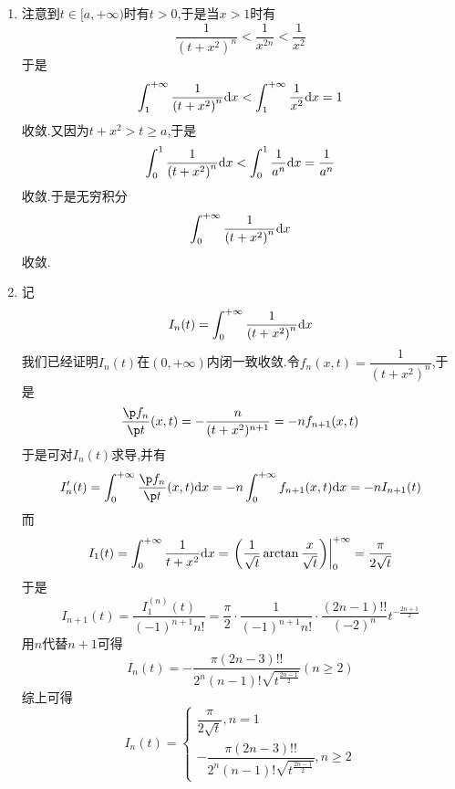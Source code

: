 \documentclass{ctexart}
\begin{document}
\begin{solution}
    \begin{enumerate}[label=\tbf{(\arabic*)},topsep=0pt,parsep=0pt,itemsep=0pt,partopsep=0pt]
        \item 注意到$t\in[a,+\infty)$时有$t>0$,于是当$x>1$时有
            \[\dfrac{1}{(t+x^2)^n}<\dfrac{1}{x^{2n}}<\dfrac{1}{x^2}\]
            于是
            \[\int_1^{+\infty}\dfrac{1}{\left(t+x^2\right)^n}\mathrm{d} x<\int_1^{+\infty}\dfrac{1}{x^2}\mathrm{d} x=1\]
            收敛.又因为$t+x^2>t\geqslant a$,于是
            \[\int_0^1\dfrac{1}{\left(t+x^2\right)^n}\mathrm{d} x<\int_0^1\dfrac{1}{a^n}\mathrm{d} x=\dfrac{1}{a^n}\]
            收敛.于是无穷积分
            \[\int_0^{+\infty}\dfrac{1}{\left(t+x^2\right)^n}\mathrm{d} x\]
            收敛.
        \item 记
            \[I_n(t)=\int_0^{+\infty}\dfrac{1}{\left(t+x^2\right)^n}\mathrm{d} x\]
            我们已经证明$I_n(t)$在$(0,+\infty)$内闭一致收敛.令$f_n(x,t)=\dfrac{1}{\left(t+x^2\right)^n}$,于是
            \[\dfrac{\p f_n}{\p t}(x,t)=-\dfrac{n}{(t+x^2)^{n+1}}=-nf_{n+1}(x,t)\]
            于是可对$I_n(t)$求导,并有
            \[I_n'(t)=\int_0^{+\infty}\dfrac{\p f_n}{\p t}(x,t)\di x
            =-n\int_0^{+\infty}f_{n+1}(x,t)\di x=-nI_{n+1}(t)\]
            而
            \[I_1(t)=\int_{0}^{+\infty}\dfrac{1}{t+x^2}\mathrm{d} x
            =\left.\left(\dfrac{1}{\sqrt{t}}\arctan\dfrac{x}{\sqrt{t}}\right)\right|_0^{+\infty}
            =\dfrac{\pi}{2\sqrt{t}}\]
            于是
            \[I_{n+1}(t)=\dfrac{I_1^{(n)}(t)}{(-1)^{n+1}n!}
            =\dfrac{\pi}{2}\cdot\dfrac{1}{(-1)^{n+1}n!}\cdot\dfrac{(2n-1)!!}{(-2)^n}t^{-\frac{2n+1}{2}}\]
            用$n$代替$n+1$可得
            \[I_n(t)=-\dfrac{\pi(2n-3)!!}{2^n(n-1)!\sqrt{t^{\frac{2n-1}{2}}}}(n\geqslant 2)\]
            综上可得
            \[I_n(t)=\left\{\begin{array}{l}
                \dfrac{\pi}{2\sqrt{t}},n=1\\
                -\dfrac{\pi(2n-3)!!}{2^n(n-1)!\sqrt{t^{\frac{2n-1}{2}}}},n\geqslant 2
            \end{array}\right.\]

    \end{enumerate}
\end{solution}
\end{document}
